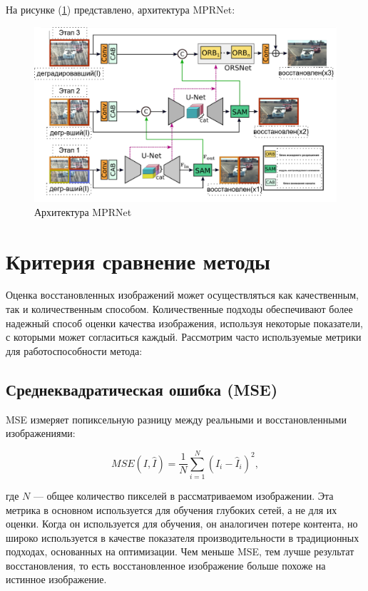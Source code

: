 На рисунке (\ref{fig:MPRNet}) представлено, архитектура MPRNet: 
\begin{figure}[H]
	\centering
	\includegraphics[width=0.7\linewidth]{assets/MPRNet.png}
	\caption{Архитектура MPRNet}
	\label{fig:MPRNet}
\end{figure}

\section{Критерия сравнение методы}

Оценка восстановленных изображений может осуществляться как качественным, так и количественным способом. Количественные подходы обеспечивают более надежный способ оценки качества изображения, используя некоторые показатели, с которыми может согласиться каждый. Рассмотрим часто используемые метрики для работоспособности метода:

\subsection{Среднеквадратическая ошибка (MSE)}

MSE измеряет попиксельную разницу между реальными и восстановленными изображениями:

\begin{equation}\label{eq:mse}
MSE(I, \hat{I}) = \frac{1}{N} \sum_{i=1}^{N} (I_{i} - \hat{I}_{i})^2,
\end{equation}

где \(N\) — общее количество пикселей в рассматриваемом изображении. Эта метрика в основном используется для обучения глубоких сетей, а не для их оценки. Когда он используется для обучения, он аналогичен потере контента, но широко используется в качестве показателя производительности в традиционных подходах, основанных на оптимизации. Чем меньше MSE, тем лучше результат восстановления, то есть восстановленное изображение больше похоже на истинное изображение.

